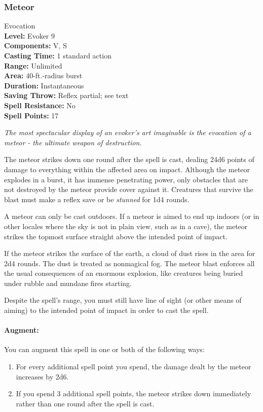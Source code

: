 \subsubsection{Meteor}
\label{Spell:Meteor}
Evocation
\\ \textbf{Level:} Evoker 9
\\ \textbf{Components:} V, S
\\ \textbf{Casting Time:} 1 standard action
\\ \textbf{Range:} Unlimited
\\ \textbf{Area:} 40-ft.-radius burst
\\ \textbf{Duration:} Instantaneous
\\ \textbf{Saving Throw:} Reflex partial; see text
\\ \textbf{Spell Resistance:} No
\\ \textbf{Spell Points:} 17

\emph{The most spectacular display of an evoker's art imaginable is the evocation of a meteor - the ultimate weapon of destruction.}

The meteor strikes down one round after the spell is cast, dealing 24d6 points of damage to everything within the affected area on impact.
Although the meteor explodes in a burst, it has immense penetrating power, only obstacles that are not destroyed by the meteor provide cover against it.
Creatures that survive the blast must make a reflex save or be \emph{stunned} for 1d4 rounds.

A meteor can only be cast outdoors. If a meteor is aimed to end up indoors (or in other locales where the sky is not in plain view, such as in a cave),
the meteor strikes the topmost surface straight above the intended point of impact.

If the meteor strikes the surface of the earth, a cloud of dust rises in the area for 2d4 rounds.
The dust is treated as nonmagical fog.
The meteor blast enforces all the usual consequences of an enormous explosion, like creatures being buried under rubble and mundane fires starting.

Despite the spell's range, you must still have line of sight (or other means of aiming) to the intended point of impact in order to cast the spell.

\paragraph{Augment:} You can augment this spell in one or both of the following ways:
\begin{enumerate}
 \item For every additional spell point you spend, the damage dealt by the meteor increases by 2d6.
 \item If you spend 3 additional spell points, the meteor strikes down immediately rather than one round after the spell is cast.
\end{enumerate}
